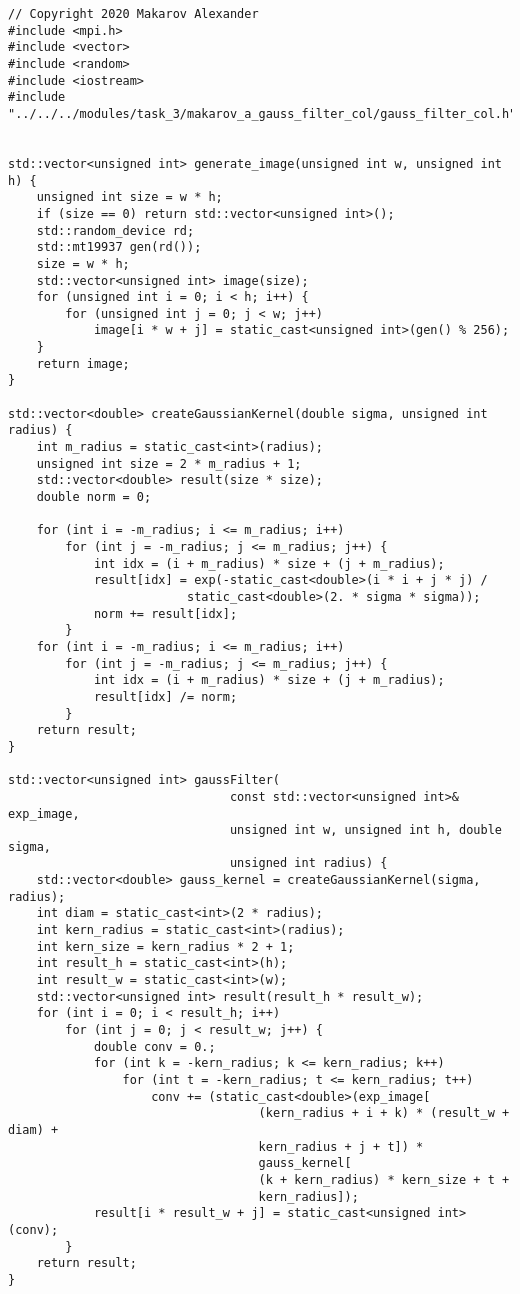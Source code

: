 \documentclass{report}
\begin{document}
\begin{lstlisting}
// Copyright 2020 Makarov Alexander
#include <mpi.h>
#include <vector>
#include <random>
#include <iostream>
#include "../../../modules/task_3/makarov_a_gauss_filter_col/gauss_filter_col.h"


std::vector<unsigned int> generate_image(unsigned int w, unsigned int h) {
    unsigned int size = w * h;
    if (size == 0) return std::vector<unsigned int>();
    std::random_device rd;
    std::mt19937 gen(rd());
    size = w * h;
    std::vector<unsigned int> image(size);
    for (unsigned int i = 0; i < h; i++) {
        for (unsigned int j = 0; j < w; j++)
            image[i * w + j] = static_cast<unsigned int>(gen() % 256);
    }
    return image;
}

std::vector<double> createGaussianKernel(double sigma, unsigned int radius) {
    int m_radius = static_cast<int>(radius);
    unsigned int size = 2 * m_radius + 1;
    std::vector<double> result(size * size);
    double norm = 0;

    for (int i = -m_radius; i <= m_radius; i++)
        for (int j = -m_radius; j <= m_radius; j++) {
            int idx = (i + m_radius) * size + (j + m_radius);
            result[idx] = exp(-static_cast<double>(i * i + j * j) /
                         static_cast<double>(2. * sigma * sigma));
            norm += result[idx];
        }
    for (int i = -m_radius; i <= m_radius; i++)
        for (int j = -m_radius; j <= m_radius; j++) {
            int idx = (i + m_radius) * size + (j + m_radius);
            result[idx] /= norm;
        }
    return result;
}

std::vector<unsigned int> gaussFilter(
                               const std::vector<unsigned int>& exp_image,
                               unsigned int w, unsigned int h, double sigma,
                               unsigned int radius) {
    std::vector<double> gauss_kernel = createGaussianKernel(sigma, radius);
    int diam = static_cast<int>(2 * radius);
    int kern_radius = static_cast<int>(radius);
    int kern_size = kern_radius * 2 + 1;
    int result_h = static_cast<int>(h);
    int result_w = static_cast<int>(w);
    std::vector<unsigned int> result(result_h * result_w);
    for (int i = 0; i < result_h; i++)
        for (int j = 0; j < result_w; j++) {
            double conv = 0.;
            for (int k = -kern_radius; k <= kern_radius; k++)
                for (int t = -kern_radius; t <= kern_radius; t++)
                    conv += (static_cast<double>(exp_image[
                                   (kern_radius + i + k) * (result_w + diam) +
                                   kern_radius + j + t]) *
                                   gauss_kernel[
                                   (k + kern_radius) * kern_size + t +
                                   kern_radius]);
            result[i * result_w + j] = static_cast<unsigned int>(conv);
        }
    return result;
}


\end{lstlisting}
\end{document}

